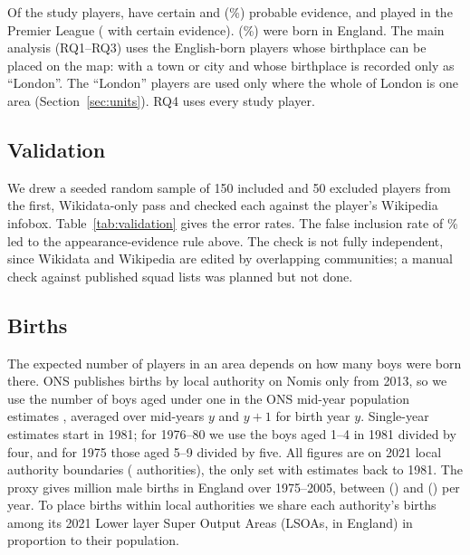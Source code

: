 \begin{table}[ht]
\centering
\caption{Study population. Born 1975--2005, men only, with evidence of a league appearance in the top two divisions between 1992/93 and 2025/26.}
\label{tab:flow}
\end{table}

Of the \nStudy{} study players, \nCertain{} have certain and \nProbable{} (\shareProbable\%) probable evidence, and \nPremier{} played in the Premier League (\nPremierCertain{} with certain evidence). \nEnglish{} (\shareEnglish\%) were born in England. The main analysis (RQ1--RQ3) uses the \nMapped{} English-born players whose birthplace can be placed on the map: \nTown{} with a town or city and \nLondonOnly{} whose birthplace is recorded only as ``London''. The ``London'' players are used only where the whole of London is one area (Section~\ref{sec:units}). RQ4 uses every study player.

\subsection{Validation}
\label{sec:validation}
We drew a seeded random sample of 150 included and 50 excluded players from the first, Wikidata-only pass and checked each against the player's Wikipedia infobox. Table~\ref{tab:validation} gives the error rates. The false inclusion rate of \valFIpct\% led to the appearance-evidence rule above. The check is not fully independent, since Wikidata and Wikipedia are edited by overlapping communities; a manual check against published squad lists was planned but not done.

\begin{table}[ht]
\centering
\caption{Validation of the first, Wikidata-only eligibility pass against the English Wikipedia infobox. Undecidable cases are not counted in the rates.}
\label{tab:validation}
\end{table}

\subsection{Births}
\label{sec:births}
The expected number of players in an area depends on how many boys were born there. ONS publishes births by local authority on Nomis only from 2013, so we use the number of boys aged under one in the ONS mid-year population estimates \cite{onsnomis}, averaged over mid-years $y$ and $y+1$ for birth year $y$. Single-year estimates start in 1981; for 1976--80 we use the boys aged 1--4 in 1981 divided by four, and for 1975 those aged 5--9 divided by five. All figures are on 2021 local authority boundaries (\nLAD{} authorities), the only set with estimates back to 1981. The proxy gives \birthsTotal{} million male births in England over 1975--2005, between \birthsLow{} (\birthsLowYear) and \birthsHigh{} (\birthsHighYear) per year. To place births within local authorities we share each authority's births among its 2021 Lower layer Super Output Areas (LSOAs, \nLSOA{} in England) in proportion to their population.

